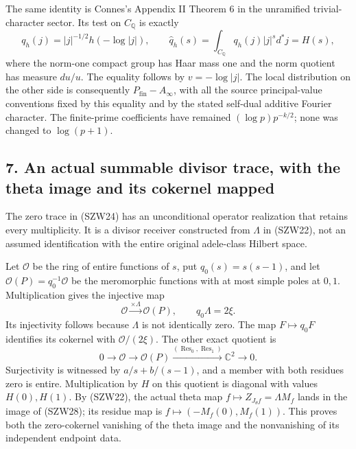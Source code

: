 \documentclass[
  10pt,
  a4paper,
]{article}
\begin{document}
The same identity is Connes's Appendix II Theorem 6 in the unramified
trivial-character sector. Its test on \(C_{\mathbb Q}\) is exactly \[
q_h(j)=|j|^{-1/2}h(-\log|j|),\qquad
\widehat q_h(s)=\int_{C_{\mathbb Q}}q_h(j)|j|^s d^*j=H(s),
\tag{SZW27}
\] where the norm-one compact group has Haar mass one and the norm
quotient has measure \(du/u\). The equality follows by \(v=-\log|j|\).
The local distribution on the other side is consequently
\(P_{\mathrm{fin}}-A_\infty\), with all the source principal-value
conventions fixed by this equality and by the stated self-dual additive
Fourier character. The finite-prime coefficients have remained
\((\log p)p^{-k/2}\); none was changed to \(\log(p+1)\).

\subsection{7. An actual summable divisor trace, with the theta image
and its cokernel
mapped}\label{an-actual-summable-divisor-trace-with-the-theta-image-and-its-cokernel-mapped}

The zero trace in (SZW24) has an unconditional operator realization that
retains every multiplicity. It is a divisor receiver constructed from
\(\Lambda\) in (SZW22), not an assumed identification with the entire
original adele-class Hilbert space.

Let \(\mathcal O\) be the ring of entire functions of \(s\), put
\(q_0(s)=s(s-1)\), and let \(\mathcal O(P)=q_0^{-1}\mathcal O\) be the
meromorphic functions with at most simple poles at \(0,1\).
Multiplication gives the injective map \[
\mathcal O\xrightarrow{\times\Lambda}\mathcal O(P),\qquad
q_0\Lambda=2\xi.
\tag{SZW28}
\] Its injectivity follows because \(\Lambda\) is not identically zero.
The map \(F\mapsto q_0F\) identifies its cokernel with
\(\mathcal O/(2\xi)\). The other exact quotient is \[
0\to\mathcal O\to\mathcal O(P)
\xrightarrow{(\operatorname{Res}_0,\operatorname{Res}_1)}\mathbb C^2\to0.
\tag{SZW29}
\] Surjectivity is witnessed by \(a/s+b/(s-1)\), and a member with both
residues zero is entire. Multiplication by \(H\) on this quotient is
diagonal with values \(H(0),H(1)\). By (SZW22), the actual theta map
\(f\mapsto Z_{J_\theta f}=\Lambda M_f\) lands in the image of (SZW28);
its residue map is \(f\mapsto(-M_f(0),M_f(1))\). This proves both the
zero-cokernel vanishing of the theta image and the nonvanishing of its
independent endpoint data.
\end{document}
